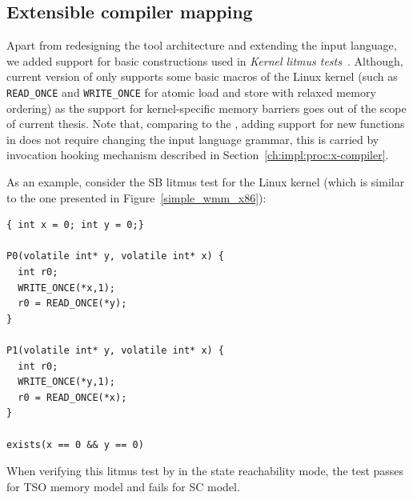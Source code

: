 \subsection{Extensible compiler mapping}

Apart from redesigning the tool architecture and extending the input language, we added support for basic constructions used in \textit{Kernel litmus tests}~\cite{alglave2018frightening}.
Although, current version of \porthos[2] only supports some basic macros of the Linux kernel (such as \texttt{READ\_ONCE} and \texttt{WRITE\_ONCE} for atomic load and store with relaxed memory ordering) as the support for kernel-specific memory barriers goes out of the scope of current thesis.
Note that, comparing to the \porthos[1], adding support for new functions in \porthos[2] does not require changing the input language grammar, this is carried by invocation hooking mechanism described in Section~\ref{ch:impl:proc:x-compiler}.

As an example, consider the SB litmus test for the Linux kernel (which is similar to the one presented in Figure~\ref{simple_wmm_x86}):
\begin{lstlisting}
{ int x = 0; int y = 0;}

P0(volatile int* y, volatile int* x) {
  int r0;
  WRITE_ONCE(*x,1);
  r0 = READ_ONCE(*y);
}

P1(volatile int* y, volatile int* x) {
  int r0;
  WRITE_ONCE(*y,1);
  r0 = READ_ONCE(*x);
}

exists(x == 0 && y == 0)
\end{lstlisting}

When verifying this litmus test by \porthos[2] in the state reachability mode, the test passes for TSO memory model and fails for SC model.

